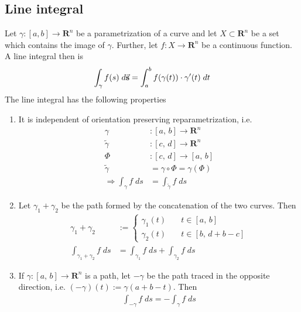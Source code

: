 \documentclass[8pt]{extarticle}
\newcommand{\R}{{\mathbb R}}
\newcommand{\X}{{\mathcal X}}
\newcommand{\ra}{{\rightarrow}}
\newcommand{\Ra}{{\Rightarrow}}
\def\R{\mathbf{R}}
\def\X{X}
\begin{document}
\begin{multicols*}{3}
  \subsection{Line integral}
  Let $\gamma: [a, b] \ra \R^n$ be a parametrization
  of a curve and let $\X \subset \R^n$ be a set which contains
  the image of $\gamma$. Further, let $f: \X \ra \R^n$ be a continuous
  function. A line integral then is
  \begin{align*}
    \int_\gamma f(s) \; d \vectorarrow{s} = \int_a^b f(\gamma(t)) \cdot \gamma'(t) \; dt
  \end{align*}
  The line integral has the following properties
  \begin{enumerate}[label=(\arabic*)]
    \item It is independent of orientation preserving reparametrization, i.e.
          \begin{align*}
            \gamma                  & : [a,\, b] \ra \R^n                      \\
            \tilde{\gamma}          & : [c,\, d] \ra \R^n                      \\
            \varPhi                 & : [c, \, d] \ra [a, \, b]                \\
            \tilde{\gamma}          & = \gamma \circ \varPhi = \gamma(\varPhi) \\
            \Ra \int_\gamma f \; ds & = \int_{\tilde{\gamma}} f \; ds
          \end{align*}
    \item Let $\gamma_1 + \gamma_2$ be the path formed
          by the concatenation of the two curves. Then
          \begin{align*}
            \gamma_1 + \gamma_2                & :=
            \begin{cases}
              \gamma_1(t) \quad & t \in [a, \, b]         \\
              \gamma_2(t) \quad & t \in [b, \, d + b - c]
            \end{cases}                                                              \\
            \int_{\gamma_1 + \gamma_2} f \; ds & = \int_{\gamma_1} f \; ds + \int_{\gamma_2} f\; ds
          \end{align*}
    \item If $\gamma: [a, \, b] \ra \R^n$ is a path, let $-\gamma$
          be the path traced in the opposite direction, i.e.
          $(-\gamma)(t) := \gamma(a + b - t)$. Then
          \begin{align*}
            \int_{-\gamma} f \; ds = - \int_\gamma f \; ds
          \end{align*}
  \end{enumerate}

\end{multicols*}
\end{document}
